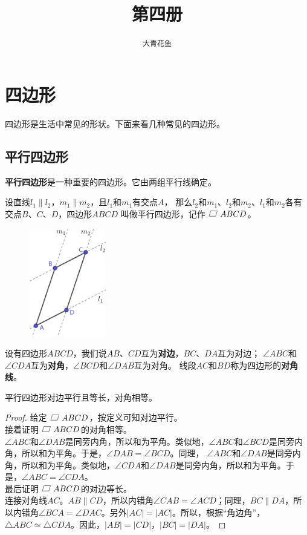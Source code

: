 \documentclass[12pt,UTF8]{ctexbook}
\title{\zihao{0} \bfseries 第四册}
\author{\zihao{2} \texttt{大青花鱼}}
\date{}
\begin{document}
\maketitle
\tableofcontents
\newpage

\chapter{四边形}
四边形是生活中常见的形状。下面来看几种常见的四边形。
\section{平行四边形}

\textbf{平行四边形}是一种重要的四边形。它由两组平行线确定。

设直线$l_1 \parallel l_2$，$m_1 \parallel m_2$，且$l_1$和$m_1$有交点$A$，
那么$l_2$和$m_1$、$l_2$和$m_2$、$l_1$和$m_2$各有交点$B$、$C$、$D$，四边形$ABCD$
叫做平行四边形，记作$\parasbx ABCD$。

\begin{figure} %
    \vspace{-24pt}
    \centering
    \includegraphics[width=0.3\textwidth]{tu/平行四边形0.png}
\end{figure}

设有四边形$ABCD$，我们说$AB$、$CD$互为\textbf{对边}，$BC$、$DA$互为对边；
$\angle ABC$和$\angle CDA$互为\textbf{对角}，$\angle BCD$和$\angle DAB$互为对角。
线段$AC$和$BD$称为四边形的\textbf{对角线}。

\begin{tm}\label{tm:0-0-0}
    平行四边形对边平行且等长，对角相等。
\end{tm}
\begin{proof}
    给定$\parasbx ABCD$，按定义可知对边平行。\\
    接着证明$\parasbx ABCD$的对角相等。\\
    $\angle ABC$和$\angle DAB$是同旁内角，所以和为平角。类似地，$\angle ABC$和$\angle BCD$是同旁内角，所以和为平角。于是，$\angle DAB = \angle BCD$。同理， $\angle ABC$和$\angle DAB$是同旁内角，所以和为平角。类似地，$\angle CDA$和$\angle DAB$是同旁内角，所以和为平角。于是，$\angle ABC = \angle CDA$。\\
    最后证明$\parasbx ABCD$的对边等长。\\
    连接对角线$AC$。$AB \parallel CD$，所以内错角$\angle CAB = \angle ACD$；同理，$BC \parallel DA$，所以内错角$\angle BCA = \angle DAC$。另外$|AC| = |AC|$。所以，根据“角边角”，$\triangle ABC \simeq \triangle CDA$。因此，$|AB| = |CD|$，$|BC| = |DA|$。    
\end{proof}
\end{document}
